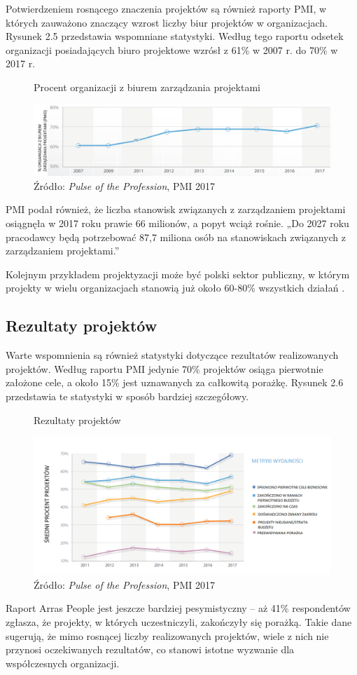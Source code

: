 Potwierdzeniem rosnącego znaczenia projektów są również raporty PMI, w których zauważono znaczący wzrost liczby biur projektów w organizacjach. Rysunek 2.5 przedstawia wspomniane statystyki. Według tego raportu odsetek organizacji posiadających biuro projektowe wzrósł z 61\% w 2007 r. do 70\% w 2017 r.
\begin{figure}
\caption{Procent organizacji z biurem zarządzania projektami}
\centering
\includegraphics[width=15cm]{img/pmos_PL.png}
\caption*{Źródło: \textit{Pulse of the Profession}, PMI 2017}
\end{figure}
PMI podał również, że liczba stanowisk związanych z zarządzaniem projektami osiągnęła w 2017 roku prawie 66 milionów, a popyt wciąż rośnie. „Do 2027 roku pracodawcy będą potrzebować 87,7 miliona osób na stanowiskach związanych z zarządzaniem projektami.” \autocite{job}

Kolejnym przykładem projektyzacji może być polski sektor publiczny, w którym projekty w wielu organizacjach stanowią już około 60-80\% wszystkich działań \autocite{Prawelska2011}.

\subsection{Rezultaty projektów}
Warte wspomnienia są również statystyki dotyczące rezultatów realizowanych projektów. Według raportu PMI jedynie 70\% projektów osiąga pierwotnie założone cele, a około 15\% jest uznawanych za całkowitą porażkę. Rysunek 2.6 przedstawia te statystyki w sposób bardziej szczegółowy.
\begin{figure}
\centering
\caption{Rezultaty projektów}
\includegraphics[width=16cm]{img/pmi_rezultaty_PL.png}
\caption*{Źródło: \textit{Pulse of the Profession}, PMI 2017}
\end{figure}
Raport Arras People jest jeszcze bardziej pesymistyczny – aż 41\% respondentów zgłasza, że projekty, w których uczestniczyli, zakończyły się porażką. \autocite{arras2010}
Takie dane sugerują, że mimo rosnącej liczby realizowanych projektów, wiele z nich nie przynosi oczekiwanych rezultatów, co stanowi istotne wyzwanie dla współczesnych organizacji.

